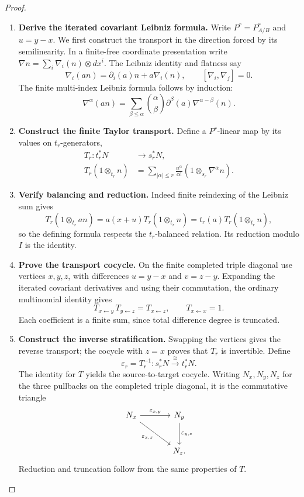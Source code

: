 \documentclass[11pt,a4paper]{article}
\numberwithin{algorithm}{section}
\numberwithin{equation}{section}
\theoremstyle{definition}
\theoremstyle{remark}
\theoremstyle{plain}
\theoremstyle{definition}
\theoremstyle{plain}
\begin{document}
\begin{proof}\leavevmode
\begin{enumerate}[leftmargin=*,align=left]
\item \textbf{Derive the iterated covariant Leibniz formula.}
Write $P^r=P^r_{A/B}$ and $u=y-x$.  We first construct the
transport in the direction forced by its semilinearity.  In a
finite-free coordinate presentation write
$\nabla n=\sum_i\nabla_i(n)\otimes dx^i$.  The Leibniz
identity and flatness say
\[
 \nabla_i(an)=\partial_i(a)n+a\nabla_i(n),\qquad
 [\nabla_i,\nabla_j]=0.
\]
The finite multi-index Leibniz formula follows by induction:
\[
 \nabla^\alpha(an)=
 \sum_{\beta\le\alpha}\binom\alpha\beta
 \partial^\beta(a)\nabla^{\alpha-\beta}(n).
\]

\item \textbf{Construct the finite Taylor transport.}
Define a $P^r$-linear map by its values on $t_r$-generators,
\begin{equation}\label{eq:connection-taylor}
 \begin{aligned}
 T_r:t_r^*N&\longrightarrow s_r^*N,\\
 T_r(1\otimes_{t_r}n)
  &=\sum_{|\alpha|\le r}\frac{u^\alpha}{\alpha!}
           (1\otimes_{s_r}\nabla^\alpha n).
 \end{aligned}
\end{equation}

\item \textbf{Verify balancing and reduction.}
Indeed finite reindexing of the Leibniz sum gives
\[
 T_r(1\otimes_{t_r}an)
 =a(x+u)T_r(1\otimes_{t_r}n)
 =t_r(a)T_r(1\otimes_{t_r}n),
\]
so the defining formula respects the $t_r$-balanced relation.
Its reduction modulo $I$ is the identity.

\item \textbf{Prove the transport cocycle.}
On the finite completed triple diagonal use vertices $x,y,z$,
with differences $u=y-x$ and $v=z-y$.  Expanding the iterated
covariant derivatives and using their commutation, the ordinary
multinomial identity gives
\[
 T_{x\leftarrow y}\,T_{y\leftarrow z}=T_{x\leftarrow z},
 \qquad T_{x\leftarrow x}=1.
\]
Each coefficient is a finite sum, since total difference degree
is truncated.

\item \textbf{Construct the inverse stratification.}
Swapping the vertices gives the reverse transport;
the cocycle with $z=x$ proves that $T_r$ is invertible.  Define
\[
 \varepsilon_r=T_r^{-1}:s_r^*N\xrightarrow{\cong}t_r^*N.
\]
The identity for $T$ yields the source-to-target cocycle. Writing
$N_x,N_y,N_z$ for the three pullbacks on the completed triple diagonal,
it is the commutative triangle
\[
\begin{tikzcd}[column sep=large,row sep=large]
 N_x \arrow[r,"{\varepsilon_{x,y}}"]
     \arrow[dr,"{\varepsilon_{x,z}}"']
   & N_y \arrow[d,"{\varepsilon_{y,z}}"]\\
   & N_z .
\end{tikzcd}
\]
Reduction and truncation follow from the same properties of $T$.


\end{enumerate}
\end{proof}
\end{document}
